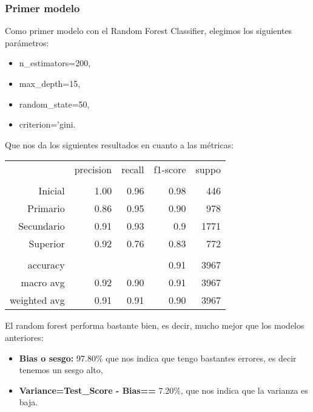 \documentclass[a4paper]{article}
\begin{document}
        \subsubsection{Primer modelo}

            Como primer modelo con el Random Forest Classifier, elegimos los siguientes parámetros:
            \begin{itemize}
                \item n\_estimators=200,
                \item max\_depth=15,
                \item random\_state=50,
                \item criterion='gini.
            \end{itemize}

            Que nos da los siguientes resultados en cuanto a las métricas:
            \begin{table}[H]
                \centering
                \begin{tabular}{rrrrr}
                    ~ & precision & recall & f1-score & suppo \\
                    & & & & \\
                    Inicial    & 1.00 & 0.96 & 0.98 & 446 \\
                    Primario   & 0.86 & 0.95 & 0.90 & 978 \\
                    Secundario & 0.91 & 0.93 & 0.9 & 1771 \\
                    Superior   & 0.92 & 0.76 & 0.83 & 772 \\
                    & & & & \\
                    accuracy & & & 0.91 & 3967 \\
                    macro avg & 0.92 & 0.90 & 0.91 & 3967 \\
                    weighted avg & 0.91 & 0.91 & 0.90 & 3967 \\
                \end{tabular}
            \end{table}

             El random forest performa bastante bien, es decir, mucho mejor que los modelos anteriores:
             \begin{itemize}
                \item \textbf{Bias o sesgo:} 97.80\% que nos indica que tengo bastantes errores, es decir tenemos un sesgo alto,
                \item \textbf{Variance=Test\_Score - Bias==} 7.20\%, que nos indica que la varianza es baja.
             \end{itemize}
\end{document}
